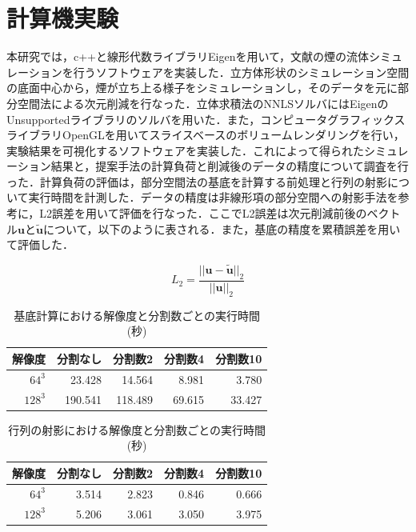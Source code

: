 \documentclass[a4j,12pt]{jreport}
\begin{document}
\chapter{計算機実験}
本研究では，c++と線形代数ライブラリEigenを用いて，文献\cite{fedkiw}の煙の流体シミュレーションを行うソフトウェアを実装した．立方体形状のシミュレーション空間の底面中心から，煙が立ち上る様子をシミュレーションし，そのデータを元に部分空間法による次元削減を行なった．立体求積法のNNLSソルバにはEigenのUnsupportedライブラリのソルバを用いた．また，コンピュータグラフィックスライブラリOpenGLを用いてスライスベースのボリュームレンダリングを行い，実験結果を可視化するソフトウェアを実装した．これによって得られたシミュレーション結果と，提案手法の計算負荷と削減後のデータの精度について調査を行った．計算負荷の評価は，部分空間法の基底を計算する前処理と行列の射影について実行時間を計測した．データの精度は非線形項の部分空間への射影手法\cite{projection_base}を参考に，L2誤差を用いて評価を行なった．ここでL2誤差は次元削減前後のベクトル$\bm{u}$と$\bm{\tilde{u}}$について，以下のように表される．また，基底の精度を累積誤差を用いて評価した．

\[
L_2 = \frac{|| \bm{u} - \bm{\tilde{u}} ||_2}{||  \bm{u} ||_2}
\]

\begin {table}[htbp]
    \centering
  \caption{基底計算における解像度と分割数ごとの実行時間(秒)}
  \label{tab:basis}
  \begin {tabular}{rrrrr} \hline
    \multicolumn{1}{c}{解像度} 					&\multicolumn{1}{c}{分割なし} 		&\multicolumn{1}{c}{分割数2}			&\multicolumn{1}{c}{分割数4} 		&\multicolumn{1}{c}{分割数10}\\ \hline
    $64^3$ 					& 23.428 			&14.564	 		&8.981	 	&3.780\\
    $128^3$ 				& 190.541 		&118.489 			& 69.615 		&33.427\\ \hline
  \end {tabular}
\end {table}


\begin {table}[htbp]
    \centering
  \caption{行列の射影における解像度と分割数ごとの実行時間(秒)}
  \label{tab:projection}
  \begin {tabular}{rrrrr} \hline
    \multicolumn{1}{c}{解像度} 					&\multicolumn{1}{c}{分割なし} 		&\multicolumn{1}{c}{分割数2}			&\multicolumn{1}{c}{分割数4} 		&\multicolumn{1}{c}{分割数10}\\ \hline
    $64^3$ 					& 3.514 			&2.823	 		&0.846	 		&0.666\\
    $128^3$ 				& 5.206 			& 3.061 			& 3.050 			&3.975\\ \hline
  \end {tabular}
\end {table}
\end{document}
